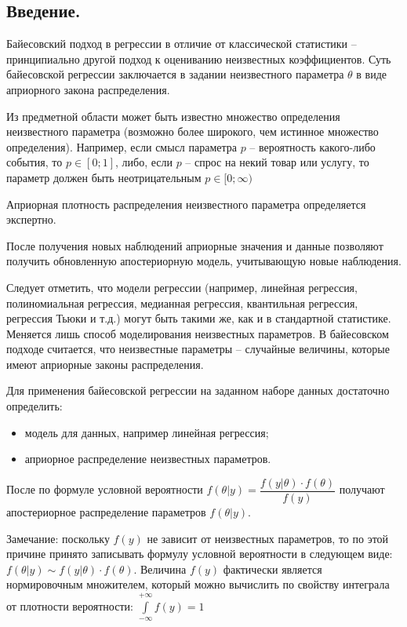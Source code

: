 \documentclass[a4paper,12pt]{article}
\begin{document}
\subsection*{Введение.\\} Байесовский подход в регрессии в отличие от классической статистики -- принципиально другой подход к оцениванию неизвестных коэффициентов. Суть байесовской регрессии заключается в задании неизвестного параметра $\theta$ в виде априорного закона распределения.

Из предметной области может быть известно множество определения неизвестного параметра (возможно более широкого, чем истинное множество определения). Например, если смысл параметра $p$ -- вероятность какого-либо события, то $p\in [0;1]$, либо, если $p$ -- спрос на некий товар или услугу, то параметр должен быть неотрицательным $p\in [0;\infty)$

Априорная плотность распределения неизвестного параметра определяется экспертно.

После получения новых наблюдений априорные значения и данные позволяют получить обновленную апостериорную модель, учитывающую новые наблюдения.

Следует отметить, что модели регрессии (например, линейная регрессия, полиномиальная регрессия, медианная регрессия, квантильная регрессия, регрессия Тьюки и т.д.) могут быть такими же, как и в стандартной статистике. Меняется лишь способ моделирования неизвестных параметров. В байесовском подходе считается, что неизвестные параметры -- случайные величины, которые имеют априорные законы распределения.

Для применения байесовской регрессии на заданном наборе данных достаточно определить:
\begin{itemize}
    \item модель для данных, например линейная регрессия;
    \item априорное распределение неизвестных параметров.
\end{itemize}

После по формуле условной вероятности $f(\theta|y) = \dfrac{f(y|\theta) \cdot f(\theta)}{f(y)}$ получают апостериорное распределение параметров $f(\theta|y)$.

Замечание: поскольку $f(y)$ не зависит от неизвестных параметров, то по этой причине принято записывать формулу условной вероятности в следующем виде: $f(\theta|y) \sim f(y|\theta) \cdot f(\theta)$. Величина $f(y)$ фактически является нормировочным множителем, который можно вычислить по свойству интеграла от плотности вероятности: $\int\limits_{-\infty}^{+\infty} f(y) = 1$
\end{document}
